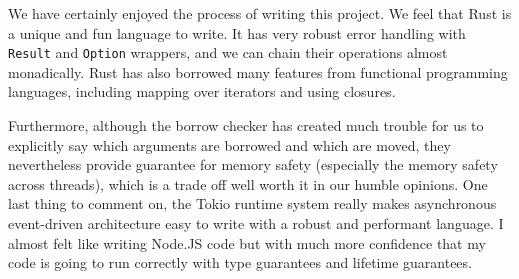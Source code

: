 \documentclass[letterpaper,11pt,twocolumn]{article}
\begin{document}
We have certainly enjoyed the process of writing this project. We feel that Rust is a unique and fun language to write. It has very robust error handling with \texttt{Result} and \texttt{Option} wrappers, and we can chain their operations almost monadically. Rust has also borrowed many features from functional programming languages, including mapping over iterators and using closures. 

Furthermore, although the borrow checker has created much trouble for us to explicitly say which arguments are borrowed and which are moved, they nevertheless provide guarantee for memory safety (especially the memory safety across threads), which is a trade off well worth it in our humble opinions. One last thing to comment on, the Tokio runtime system really makes asynchronous event-driven architecture easy to write with a robust and performant language. I almost felt like writing Node.JS code but with much more confidence that my code is going to run correctly with type guarantees and lifetime guarantees.


\medskip
\nocite{*}
\printbibliography

%
%
\end{document}
